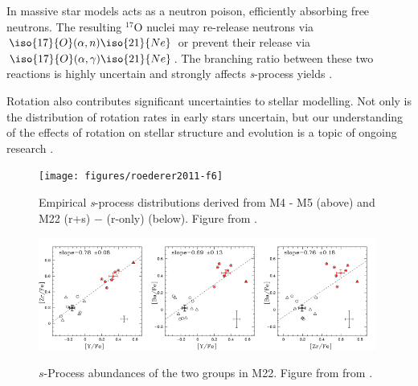 \documentclass[]{article}
\begin{document}
In massive star models  acts as a neutron poison, efficiently absorbing free neutrons. The resulting $^{17}$O nuclei may re-release neutrons via $\iso{17}{O}(\alpha,n)\iso{21}{Ne}$ or prevent their release via $\iso{17}{O}(\alpha,\gamma)\iso{21}{Ne}$. The branching ratio between these two reactions is highly uncertain and strongly affects \textit{s}-process yields \citep{Frischknecht:2012il}.

Rotation also contributes significant uncertainties to stellar modelling. Not only is the distribution of rotation rates in early stars uncertain, but our understanding of the effects of rotation on stellar structure and evolution is a topic of ongoing research \citep{Langer:2012jy}.

\begin{figure}
 \begin{center}\texttt{[image: figures/roederer2011-f6]}\end{center}
 \caption{Empirical \textit{s}-process distributions derived from M4 - M5 (above) and M22 (r+s) $-$ (r-only) (below). Figure from \citet{Roederer:2011hw}.}\label{fig:roederer2011-f6}
\end{figure}

\begin{figure}
 \begin{center}\includegraphics[width=0.33\textwidth]{figures/marino09-f7a}\includegraphics[width=0.33\textwidth]{figures/marino09-f7b}\includegraphics[width=0.33\textwidth]{figures/marino09-f7c}\end{center}
 \caption{$s$-Process abundances of the two groups in M22. Figure from from \citet{Marino:2009je}.}\label{fig:marino09-f7}
\end{figure}
\end{document}
